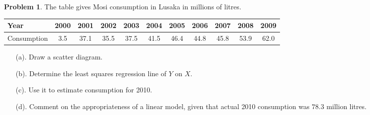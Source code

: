 \documentclass[11pt,a4paper]{article}
\theoremstyle{definition}
\newtheorem{problemx}{Problem}[section]
\newenvironment{problem}{\begin{problemx}}{\end{problemx}}
\begin{document}
\begin{problem}
The table gives Mosi consumption in Lusaka in millions of litres.
\begin{table}[H]
\centering
\begin{tabular}{|l|c|c|c|c|c|c|c|c|c|c|}
\hline
Year & 2000 & 2001 & 2002 & 2003 & 2004 & 2005 & 2006 & 2007 & 2008 & 2009\\
\hline
Consumption & 3.5 & 37.1 & 35.5 & 37.5 & 41.5 & 46.4 & 44.8 & 45.8 & 53.9 & 62.0\\
\hline
\end{tabular}
\end{table}
\begin{enumerate}
\item[(a).] Draw a scatter diagram.
\item[(b).] Determine the least squares regression line of $Y$ on $X$.
\item[(c).] Use it to estimate consumption for 2010.
\item[(d).] Comment on the appropriateness of a linear model, given that actual 2010
consumption was $78.3$ million litres.
\end{enumerate}
\end{problem}
\end{document}
